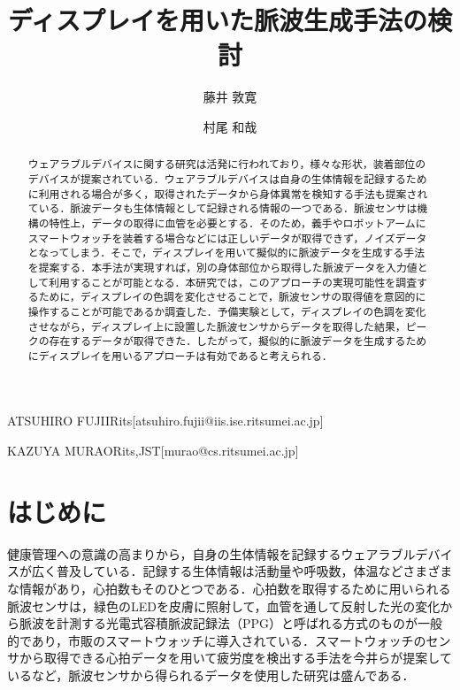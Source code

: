 \documentclass[submit,techrep]{ipsj}
\begin{document}
\title{ディスプレイを用いた脈波生成手法の検討}


\author{藤井 敦寛}{ATSUHIRO FUJII}{Rits}[atsuhiro.fujii@iis.ise.ritsumei.ac.jp]
\author{村尾 和哉}{KAZUYA MURAO}{Rits,JST}[murao@cs.ritsumei.ac.jp]

\begin{abstract}
ウェアラブルデバイスに関する研究は活発に行われており，様々な形状，装着部位のデバイスが提案されている．ウェアラブルデバイスは自身の生体情報を記録するために利用される場合が多く，取得されたデータから身体異常を検知する手法も提案されている．脈波データも生体情報として記録される情報の一つである．脈波センサは機構の特性上，データの取得に血管を必要とする．そのため，義手やロボットアームにスマートウォッチを装着する場合などには正しいデータが取得できず，ノイズデータとなってしまう．そこで，ディスプレイを用いて擬似的に脈波データを生成する手法を提案する．本手法が実現すれば，別の身体部位から取得した脈波データを入力値として利用することが可能となる．本研究では，このアプローチの実現可能性を調査するために，ディスプレイの色調を変化させることで，脈波センサの取得値を意図的に操作することが可能であるか調査した．予備実験として，ディスプレイの色調を変化させながら，ディスプレイ上に設置した脈波センサからデータを取得した結果，ピークの存在するデータが取得できた．したがって，擬似的に脈波データを生成するためにディスプレイを用いるアプローチは有効であると考えられる．
\end{abstract}

\maketitle





\section{はじめに}
\label{introduction}
健康管理への意識の高まりから，自身の生体情報を記録するウェアラブルデバイスが広く普及している．記録する生体情報は活動量や呼吸数，体温などさまざまな情報があり，心拍数もそのひとつである．心拍数を取得するために用いられる脈波センサは，緑色のLEDを皮膚に照射して，血管を通して反射した光の変化から脈波を計測する光電式容積脈波記録法（PPG）と呼ばれる方式のものが一般的であり，市販のスマートウォッチに導入されている．スマートウォッチのセンサから取得できる心拍データを用いて疲労度を検出する手法を今井ら\cite{fatigue_detection}が提案しているなど，脈波センサから得られるデータを使用した研究は盛んである．
\end{document}
